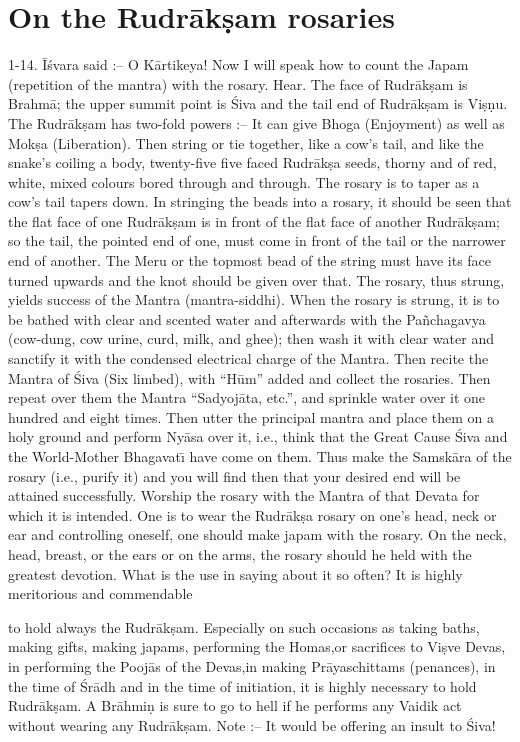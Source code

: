 \chapter{On the Rudr\=ak\d{s}am rosaries}

1-14. \=I\'svara said :-- O K\=artikeya! Now I will speak how to count the Japam (repetition of the mantra) with the rosary. Hear. The face of Rudr\=ak\d{s}am is Brahm\=a; the upper summit point is \'Siva and the tail end of Rudr\=ak\d{s}am is Vi\d{s}\d{n}u. The Rudr\=ak\d{s}am has two-fold powers :-- It can give Bhoga (Enjoyment) as well as Mok\d{s}a (Liberation). Then string or tie together, like a cow's tail, and like the snake's coiling a body, twenty-five five faced Rudr\=ak\d{s}a seeds, thorny and of red, white, mixed colours bored through and through. The rosary is to taper as a cow's tail tapers down. In stringing the beads into a rosary, it should be seen that the flat face of one Rudr\=ak\d{s}am is in front of the flat face of another Rudr\=ak\d{s}am; so the tail, the pointed end of one, must come in front of the tail or the narrower end of another. The Meru or the topmost bead of the string must have its face turned upwards and the knot should be given over that. The rosary, thus strung, yields success of the Mantra (mantra-siddhi). When the rosary is strung, it is to be bathed with clear and scented water and afterwards with the Pa\~nchagavya (cow-dung, cow urine, curd, milk, and ghee); then wash it with clear water and sanctify it with the condensed electrical charge of the Mantra. Then recite the Mantra of \'Siva (Six limbed), with ``H\=um'' added and collect the rosaries. Then repeat over them the Mantra ``Sadyoj\=ata, etc.'', and sprinkle water over it one hundred and eight times. Then utter the principal mantra and place them on a holy ground and perform Ny\=asa over it, i.e., think that the Great Cause \'Siva and the World-Mother Bhagavat\={\i} have come on them. Thus make the Samsk\=ara of the rosary (i.e., purify it) and you will find then that your desired end will be attained successfully. Worship the rosary with the Mantra of that Devata for which it is intended. One is to wear the Rudr\=ak\d{s}a rosary on one's head, neck or ear and controlling oneself, one should make japam with the rosary. On the neck, head, breast, or the ears or on the arms, the rosary should he held with the greatest devotion. What is the use in saying about it so often? It is highly meritorious and commendable

to hold always the Rudr\=ak\d{s}am. Especially on such occasions as taking baths, making gifts, making japams, performing the Homas,or sacrifices to Vi\d{s}ve Devas, in performing the Pooj\=as of the Devas,in making Pr\=ayaschittams (penances), in the time of \'Sr\=adh and in the time of initiation, it is highly necessary to hold Rudr\=ak\d{s}am. A Br\=ahmi\d{n} is sure to go to hell if he performs any Vaidik act without wearing any Rudr\=ak\d{s}am. Note :-- It would be offering an insult to \'Siva!

